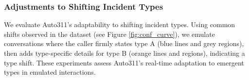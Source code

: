 

\subsubsection{Adjustments to Shifting Incident Types}

We evaluate Auto311's adaptability to shifting incident types. Using common shifts observed in the dataset (see Figure \ref{fig:conf_curve}), we emulate conversations where the caller firmly states type A (blue lines and grey regions), then adds type-specific details for type B (orange lines and regions), indicating a type shift. These experiments assess Auto311's real-time adaptation to emergent types in emulated interactions.



